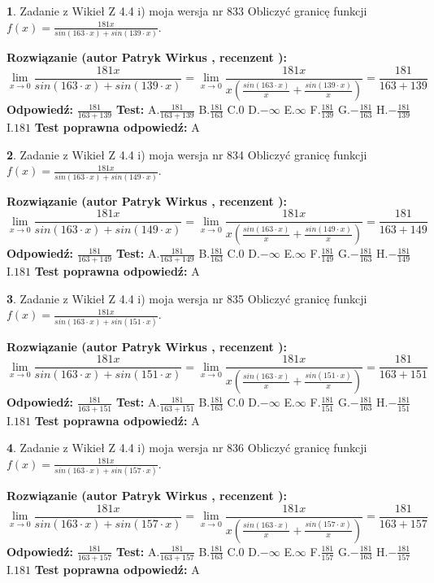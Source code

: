 \documentclass[12pt, a4paper]{article}
\theoremstyle{definition} %
\newtheorem{zad}{}
\newcommand{\zadStart}[1]{\begin{zad}#1\newline}
\newcommand{\zadStop}{\end{zad}}
\newcommand{\rozwStart}[2]{\noindent \textbf{Rozwiązanie (autor #1 , recenzent #2): }\newline}
\newcommand{\rozwStop}{\newline}
\newcommand{\odpStart}{\noindent \textbf{Odpowiedź:}\newline}
\newcommand{\odpStop}{\newline}
\newcommand{\testStart}{\noindent \textbf{Test:}\newline}
\newcommand{\testStop}{\newline}
\newcommand{\kluczStart}{\noindent \textbf{Test poprawna odpowiedź:}\newline}
\newcommand{\kluczStop}{\newline}
\begin{document}
\zadStart{Zadanie z Wikieł Z 4.4 i) moja wersja nr 833}
Obliczyć granicę funkcji $f(x)=\frac{181x}{sin(163\cdot x) +sin(139\cdot x)}$.
\zadStop
\rozwStart{Patryk Wirkus}{}
$$\lim\limits_{x\to 0}\frac{181x}{sin(163\cdot x) +sin(139\cdot x)}=\lim\limits_{x\to 0}\frac{181x}{x(\frac{sin(163\cdot x)}{x}+\frac{sin(139\cdot x)}{x})}=\frac{181}{163+139}$$
\rozwStop
\odpStart
$\frac{181}{163+139}$
\odpStop
\testStart
A.$\frac{181}{163+139}$
B.$\frac{181}{163}$
C.$0$
D.$-\infty$
E.$\infty$
F.$\frac{181}{139}$
G.$-\frac{181}{163}$
H.$-\frac{181}{139}$
I.$181$
\testStop
\kluczStart
A
\kluczStop



\zadStart{Zadanie z Wikieł Z 4.4 i) moja wersja nr 834}
Obliczyć granicę funkcji $f(x)=\frac{181x}{sin(163\cdot x) +sin(149\cdot x)}$.
\zadStop
\rozwStart{Patryk Wirkus}{}
$$\lim\limits_{x\to 0}\frac{181x}{sin(163\cdot x) +sin(149\cdot x)}=\lim\limits_{x\to 0}\frac{181x}{x(\frac{sin(163\cdot x)}{x}+\frac{sin(149\cdot x)}{x})}=\frac{181}{163+149}$$
\rozwStop
\odpStart
$\frac{181}{163+149}$
\odpStop
\testStart
A.$\frac{181}{163+149}$
B.$\frac{181}{163}$
C.$0$
D.$-\infty$
E.$\infty$
F.$\frac{181}{149}$
G.$-\frac{181}{163}$
H.$-\frac{181}{149}$
I.$181$
\testStop
\kluczStart
A
\kluczStop



\zadStart{Zadanie z Wikieł Z 4.4 i) moja wersja nr 835}
Obliczyć granicę funkcji $f(x)=\frac{181x}{sin(163\cdot x) +sin(151\cdot x)}$.
\zadStop
\rozwStart{Patryk Wirkus}{}
$$\lim\limits_{x\to 0}\frac{181x}{sin(163\cdot x) +sin(151\cdot x)}=\lim\limits_{x\to 0}\frac{181x}{x(\frac{sin(163\cdot x)}{x}+\frac{sin(151\cdot x)}{x})}=\frac{181}{163+151}$$
\rozwStop
\odpStart
$\frac{181}{163+151}$
\odpStop
\testStart
A.$\frac{181}{163+151}$
B.$\frac{181}{163}$
C.$0$
D.$-\infty$
E.$\infty$
F.$\frac{181}{151}$
G.$-\frac{181}{163}$
H.$-\frac{181}{151}$
I.$181$
\testStop
\kluczStart
A
\kluczStop



\zadStart{Zadanie z Wikieł Z 4.4 i) moja wersja nr 836}
Obliczyć granicę funkcji $f(x)=\frac{181x}{sin(163\cdot x) +sin(157\cdot x)}$.
\zadStop
\rozwStart{Patryk Wirkus}{}
$$\lim\limits_{x\to 0}\frac{181x}{sin(163\cdot x) +sin(157\cdot x)}=\lim\limits_{x\to 0}\frac{181x}{x(\frac{sin(163\cdot x)}{x}+\frac{sin(157\cdot x)}{x})}=\frac{181}{163+157}$$
\rozwStop
\odpStart
$\frac{181}{163+157}$
\odpStop
\testStart
A.$\frac{181}{163+157}$
B.$\frac{181}{163}$
C.$0$
D.$-\infty$
E.$\infty$
F.$\frac{181}{157}$
G.$-\frac{181}{163}$
H.$-\frac{181}{157}$
I.$181$
\testStop
\kluczStart
A
\kluczStop
\end{document}

